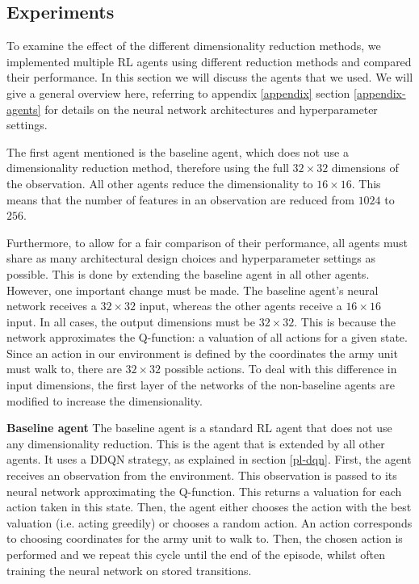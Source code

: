 \subsection{Experiments}\label{research-exp}
To examine the effect of the different dimensionality reduction methods, we implemented multiple RL agents using different reduction methods and compared their performance. In this section we will discuss the agents that we used. We will give a general overview here, referring to appendix \ref{appendix} section \ref{appendix-agents} for details on the neural network architectures and hyperparameter settings. 

The first agent mentioned is the baseline agent, which does not use a dimensionality reduction method, therefore using the full $32 \times 32$ dimensions of the observation. All other agents reduce the dimensionality to $16 \times 16$. This means that the number of features in an observation are reduced from $1024$ to $256$.

Furthermore, to allow for a fair comparison of their performance, all agents must share as many architectural design choices and hyperparameter settings as possible. This is done by extending the baseline agent in all other agents. However, one important change must be made. The baseline agent's neural network receives a $32 \times 32$ input, whereas the other agents receive a $16 \times 16$ input. In all cases, the output dimensions must be $32 \times 32$. This is because the network approximates the Q-function: a valuation of all actions for a given state. Since an action in our environment is defined by the coordinates the army unit must walk to, there are $32 \times 32$ possible actions. To deal with this difference in input dimensions, the first layer of the networks of the non-baseline agents are modified to increase the dimensionality.\newline

\noindent \textbf{Baseline agent}\newline
\noindent The baseline agent is a standard RL agent that does not use any dimensionality reduction. This is the agent that is extended by all other agents. It uses a DDQN strategy, as explained in section \ref{pl-dqn}. %
First, the agent receives an observation from the environment. This observation is passed to its neural network approximating the Q-function. This returns a valuation for each action taken in this state. Then, the agent either chooses the action with the best valuation (i.e. acting greedily) or chooses a random action. An action corresponds to choosing coordinates for the army unit to walk to. Then, the chosen action is performed and we repeat this cycle until the end of the episode, whilst often training the neural network on stored transitions.

